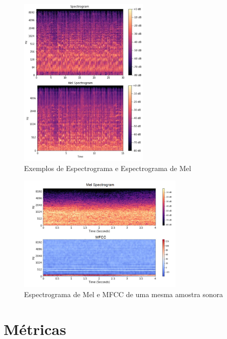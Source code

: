 \clearpage

\begin{figure}[!h]
\centering
\includegraphics[width=0.55\textwidth]{imagens/espectrograma-vs-mel-espectrograma.png}
\caption{\label{fig:specvsmelespectrograma}Exemplos de Espectrograma e Espectrograma de Mel}
\end{figure}

\begin{figure}[!h]
\centering
\includegraphics[width=0.7\textwidth]{imagens/melspec-vs-mfcc.PNG}
\caption{\label{fig:melspecvsmfcc}Espectrograma de Mel e MFCC de uma mesma amostra sonora}

\author{Fonte: Imagem adaptada de \cite{64}}
\end{figure}

\section{Métricas}\label{sec:metricas}

